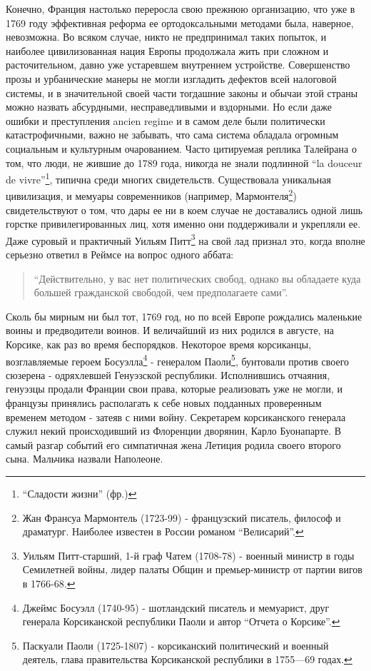 \documentclass[
  oneside,
  12pt,
  titlepage]{book}
\begin{document}
Конечно, Франция настолько переросла свою прежнюю организацию, что уже в 1769 году эффективная реформа ее ортодоксальными методами была, наверное, невозможна. Во всяком случае, никто не предпринимал таких попыток, и наиболее цивилизованная нация Европы продолжала жить при сложном и расточительном, давно уже устаревшем внутреннем устройстве. Совершенство прозы и урбанические манеры не могли изгладить дефектов всей налоговой системы, и в значительной своей части тогдашние законы и обычаи этой страны можно назвать абсурдными, несправедливыми и вздорными. Но если даже ошибки и преступления ancien regime и в самом деле были политически катастрофичными, важно не забывать, что сама система обладала огромным социальным и культурным очарованием. Часто цитируемая реплика Талейрана о том, что люди, не жившие до 1789 года, никогда не знали подлинной ``la douceur de vivre''\footnote{``Сладости жизни'' (фр.)}, типична среди многих свидетельств. Существовала уникальная цивилизация, и мемуары современников (например, Мармонтеля\footnote{Жан Франсуа Мармонтель (1723-99) - французский писатель, философ и драматург. Наиболее известен в России романом ``Велисарий''.}) свидетельствуют о том, что дары ее ни в коем случае не доставались одной лишь горстке привилегированных лиц, хотя именно они поддерживали и укрепляли ее. Даже суровый и практичный Уильям Питт\footnote{Уильям Питт-старший, 1-й граф Чатем (1708-78) - военный министр в годы Семилетней войны, лидер палаты Общин и премьер-министр от партии вигов в 1766-68.} на свой лад признал это, когда вполне серьезно ответил в Реймсе на вопрос одного аббата:

\begin{quote}
``Действительно, у вас нет политических свобод, однако вы обладаете куда большей гражданской свободой, чем предполагаете сами''.
\end{quote}

Сколь бы мирным ни был тот, 1769 год, но по всей Европе рождались маленькие воины и предводители воинов. И величайший из них родился в августе, на Корсике, как раз во время беспорядков. Некоторое время корсиканцы, возглавляемые героем Босуэлла\footnote{Джеймс Босуэлл (1740-95) - шотландский писатель и мемуарист, друг генерала Корсиканской республики Паоли и автор ``Отчета о Корсике''.} - генералом Паоли\footnote{Паскуали Паоли (1725-1807) - корсиканский политический и военный деятель, глава правительства Корсиканской республики в 1755---69 годах.}, бунтовали против своего сюзерена - одряхлевшей Генуэзской республики. Исполнившись отчаяния, генуэзцы продали Франции свои права, которые реализовать уже не могли, и французы принялись располагать к себе новых подданных проверенным временем методом - затеяв с ними войну. Секретарем корсиканского генерала служил некий происходивший из Флоренции дворянин, Карло Буонапарте. В самый разгар событий его симпатичная жена Летиция родила своего второго сына. Мальчика назвали Наполеоне.
\end{document}
